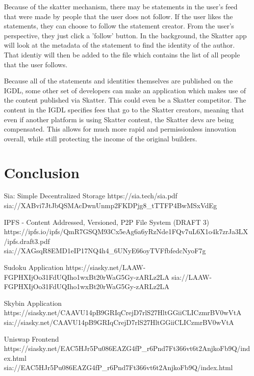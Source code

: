 \documentclass[twocolumn]{article}
\begin{document}
Because of the skatter mechanism, there may be statements in the user's feed
that were made by people that the user does not follow. If the user likes the
statements, they can choose to follow the statement creator. From the user's
perspective, they just click a 'follow' button. In the background, the Skatter
app will look at the metadata of the statement to find the identity of the
author. That identiy will then be added to the file which contains the list of
all people that the user follows.

Because all of the statements and identities themselves are published on the
IGDL, some other set of developers can make an application which makes use of
the content published via Skatter. This could even be a Skatter competitor. The
content in the IGDL specifies fees that go to the Skatter creators, meaning that
even if another platform is using Skatter content, the Skatter devs are being
compensated. This allows for much more rapid and permissionless innovation
overall, while still protecting the income of the original builders.

\section{Conclusion}

\onecolumn
\begin{thebibliography}{9}

	Sia: Simple Decentralized Storage \newline
	https://sia.tech/sia.pdf \newline
	sia://XABvi7JtJbQSMAcDwnUnmp2FKDPjg8\_tTTFP4BwMSxVdEg

	IPFS - Content Addressed, Versioned, P2P File System (DRAFT 3) \newline
	https://ipfs.io/ipfs/QmR7GSQM93Cx5eAg6a6yRzNde1FQv7uL6X1o4k7zrJa3LX/ipfs.draft3.pdf \newline
	sia://XAGsqR8EMD1eIP17NQ4h4\_6UNyE66oyTVFfbfedcNyoF7g

	Sudoku Application \newline
	https://siasky.net/LAAW-FGPHXIjOo31FdUQIho1wxBt20rWaG5Gy-zARLz2LA \newline
	sia://LAAW-FGPHXIjOo31FdUQIho1wxBt20rWaG5Gy-zARLz2LA

	Skybin Application \newline
	https://siasky.net/CAAVU14pB9GRIqCrejD7rlS27HltGGiiCLICzmrBV0wVtA \newline
	sia://siasky.net/CAAVU14pB9GRIqCrejD7rlS27HltGGiiCLICzmrBV0wVtA

	Uniswap Frontend \newline
	https://siasky.net/EAC5HJr5Pu086EAZG4fP\_r6Pnd7Ft366vt6t2AnjkoFb9Q/index.html \newline
	sia://EAC5HJr5Pu086EAZG4fP\_r6Pnd7Ft366vt6t2AnjkoFb9Q/index.html

\end{thebibliography}
\end{document}
